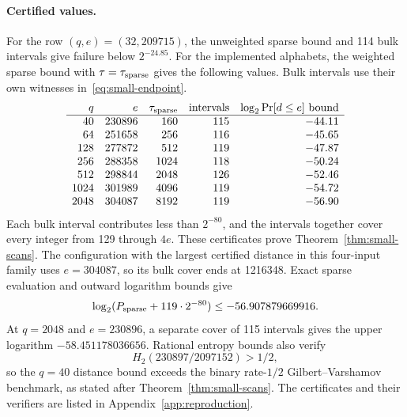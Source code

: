 \paragraph{Certified values.}
For the row $(q,e)=(32,209715)$, the unweighted sparse bound and
114 bulk intervals give failure below $2^{-24.85}$. For the implemented
alphabets, the weighted sparse bound with $\tau=\tau_{\rm sparse}$ gives
the following values. Bulk intervals use their own witnesses
in~\eqref{eq:small-endpoint}.
\[
\begin{array}{r@{\quad}r@{\quad}r@{\quad}r@{\quad}r}
q&e&\tau_{\rm sparse}&\text{intervals}&\log_2\Pr[d\le e]\text{ bound}\\\hline
40&230896&160&115&-44.11\\
64&251658&256&116&-45.65\\
128&277872&512&119&-47.87\\
256&288358&1024&118&-50.24\\
512&298844&2048&126&-52.46\\
1024&301989&4096&119&-54.72\\
2048&304087&8192&119&-56.90
\end{array}
\]
Each bulk interval contributes less than $2^{-80}$, and the intervals
together cover every integer from 129 through $4e$. These certificates
prove Theorem~\ref{thm:small-scans}. The configuration with the largest
certified distance in this four-input family uses $e=304087$, so its
bulk cover ends at 1216348. Exact sparse evaluation and outward
logarithm bounds give
\[
 \log_2(P_{\rm sparse}+119\cdot2^{-80})
 \le -56.907879669916.
\]
At $q=2048$ and $e=230896$, a separate cover of 115 intervals gives
the upper logarithm $-58.451178036656$. Rational entropy bounds also
verify
\[
 H_2(230897/2097152)>1/2,
\]
so the $q=40$ distance bound exceeds the binary rate-$1/2$
Gilbert--Varshamov benchmark, as stated after Theorem~\ref{thm:small-scans}.
The certificates and their verifiers are listed in
Appendix~\ref{app:reproduction}.
